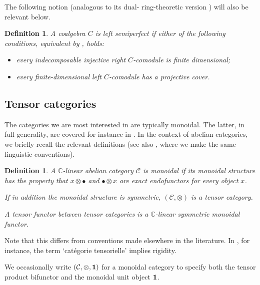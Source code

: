 \documentclass[11pt]{article}
\theoremstyle{plain}
\theoremstyle{nonumberplain}
\theoremstyle{plain}
\newtheorem{definition}[lemma]{Definition}
\numberwithin{equation}{section}
\theoremstyle{nonumberplain}
\newcommand\bC{{\mathbb C}}
\newcommand\cC{{\mathcal C}}
\newcommand\1{{\bf 1}}
\begin{document}
The following notion (analogous to its dual- ring-theoretic version \cite[discussion preceding Theorem 2.1]{bass}) will also be relevant below.

\begin{definition}\label{def:perf}
  A coalgebra $C$ is {\it left semiperfect} if either of the following conditions, equivalent by \cite[Theorem 10]{lin}, holds{:}
  \begin{itemize}
  \item[$-$] every indecomposable injective right $C$-comodule is finite dimensional;
  \item[$-$] every finite-dimensional left $C$-comodule has a projective cover.
  \end{itemize}
\end{definition}


\subsection{Tensor categories}\label{subse:mon}

The categories we are most interested in are typically monoidal. The latter, in full generality, are covered for instance in \cite[Chapter XI]{cats}. In the context of abelian categories, we briefly recall the relevant definitions (see also \cite[\S 3.6]{us0}, where we make the same linguistic conventions). 

\begin{definition}\label{def:mon}
  A $\bC$-linear abelian category $\cC$ is {\it monoidal} if its monoidal structure has the property that $x\otimes \bullet$ and $\bullet\otimes x$ are exact endofunctors for every object $x$.

  If in addition the monoidal structure is symmetric, $(\cC,\otimes)$ is a {\it tensor category}.

  A {\it tensor functor} between tensor  categories is a $\bC$-linear symmetric monoidal functor.
\end{definition}

Note that this differs from conventions made elsewhere in the literature. In \cite[\S 1.2]{del-tan}, for instance, the term `cat\'egorie tensorielle' implies rigidity.

We occasionally write $(\cC,\otimes, {\bf 1})$ for a monoidal category to specify both the tensor product bifunctor and the monoidal unit object ${\bf 1}$. 
\end{document}
